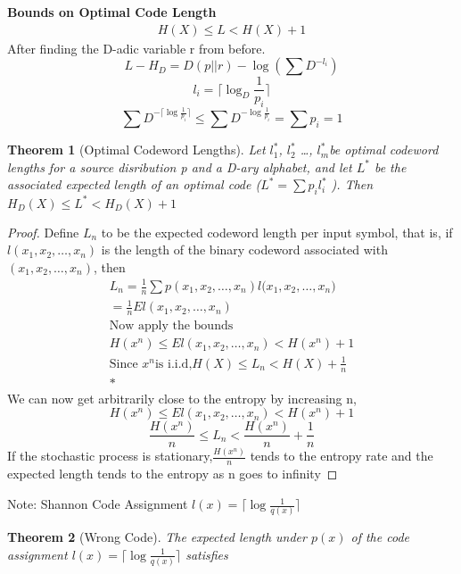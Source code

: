 \documentclass[10pt]{article}
\newtheorem{thm}{Theorem}[section]
\begin{document}
\begin{tiny}
\begin{multicols}{3}



\textbf{\scriptsize Bounds on Optimal Code Length}
\begin{eqnarray*}
    H(X) \leq L < H(X) + 1
\end{eqnarray*}
After finding the D-adic variable r from before.
\[ L-H_D = D(p||r) - \log (\sum D^{-l_i}) \]
\[ {l_i} = \lceil{\log_D \frac {1}{p_i}} \rceil \]
\[ \sum D^{- \lceil \log \frac {1}{p_i}\rceil}\leq\sum D^{- \log\frac{1}{p_i}}=\sum {p_i}=1 \] 
\begin{thm}[Optimal Codeword Lengths] \label{thm:optimum codewords}
    Let ${l_1^{*}}$, ${l_2^{*}}$ \ldots , ${l_m^{*}}$be optimal codeword lengths for a
    source disribution p and a D-ary alphabet, and let ${L^{*}}$ be the associated
    expected length of an optimal code (${L^{*}}=\sum{p_i}{l_i^{*}}$ ). Then
    ${H_D(X)}\leq L^{*}<{H_D(X)}+1$ 
\end{thm}
\begin{proof}
    Define ${L_n}$ to be the expected codeword length per input symbol, that is,
    if ${l(x_1,x_2, \ldots ,x_n)}$ is the length of the binary codeword associated with
    ${(x_1,x_2, \ldots ,x_n)}$, then 
    \begin{eqnarray*}
        {L_n} = \frac {1}{n}\sum{p(x_1,x_2, \ldots ,x_n)}{l(x_1,x_2, \ldots ,x_n})\\
        = \frac{1}{n}El(x_1,x_2, \ldots ,x_n)\\
        \text{Now apply the bounds}\\
        {H(x^{n})} \leq El(x_1,x_2, \ldots ,x_n) < {H(x^{n})} + 1 \\
        \text{Since } {x^{n}} \text{is i.i.d,} {H(X)} \leq {L_n} < {H(X)} + \frac{1}{n} \\*
    \end{eqnarray*}
    We can now get arbitrarily close to the entropy by increasing n, 
    \[{H(x^{n})} \leq El(x_1,x_2, \ldots ,x_n) < {H(x^{n})} + 1\]
    \[\frac{H(x^{n})}{n} \leq {L_n} < \frac{H(x^{n})}{n}+\frac{1}{n}\]
    If the stochastic process is stationary,$\frac{H(x^{n})}{n}$ tends to the entropy rate 
    and the expected length tends to the entropy as n goes to infinity \end{proof}
    Note: Shannon Code Assignment $l(x) = \lceil \log \frac {1}{q(x)} \rceil$
    \begin{thm}[Wrong Code] \label{thm:wrongcode}
        The expected length under ${p(x)}$ of the code assignment ${l(x)}=\lceil\log\frac{1}{q(x)}\rceil$ satisfies 

\end{thm}
\end{multicols}
\end{tiny}
\end{document}
